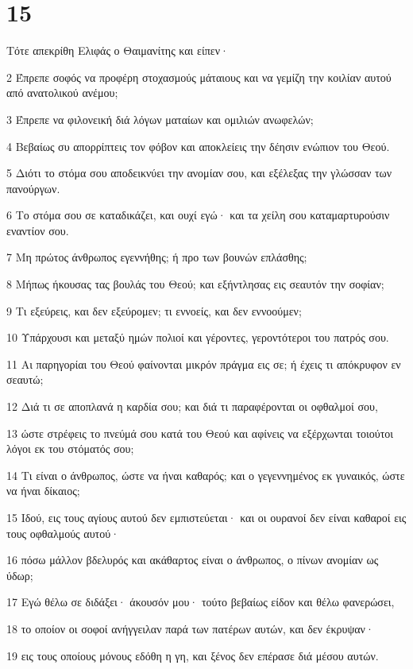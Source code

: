 \chapter{15}

\par Τότε απεκρίθη Ελιφάς ο Θαιμανίτης και είπεν·
\par 2 Έπρεπε σοφός να προφέρη στοχασμούς μάταιους και να γεμίζη την κοιλίαν αυτού από ανατολικού ανέμου;
\par 3 Έπρεπε να φιλονεική διά λόγων ματαίων και ομιλιών ανωφελών;
\par 4 Βεβαίως συ απορρίπτεις τον φόβον και αποκλείεις την δέησιν ενώπιον του Θεού.
\par 5 Διότι το στόμα σου αποδεικνύει την ανομίαν σου, και εξέλεξας την γλώσσαν των πανούργων.
\par 6 Το στόμα σου σε καταδικάζει, και ουχί εγώ· και τα χείλη σου καταμαρτυρούσιν εναντίον σου.
\par 7 Μη πρώτος άνθρωπος εγεννήθης; ή προ των βουνών επλάσθης;
\par 8 Μήπως ήκουσας τας βουλάς του Θεού; και εξήντλησας εις σεαυτόν την σοφίαν;
\par 9 Τι εξεύρεις, και δεν εξεύρομεν; τι εννοείς, και δεν εννοούμεν;
\par 10 Υπάρχουσι και μεταξύ ημών πολιοί και γέροντες, γεροντότεροι του πατρός σου.
\par 11 Αι παρηγορίαι του Θεού φαίνονται μικρόν πράγμα εις σε; ή έχεις τι απόκρυφον εν σεαυτώ;
\par 12 Διά τι σε αποπλανά η καρδία σου; και διά τι παραφέρονται οι οφθαλμοί σου,
\par 13 ώστε στρέφεις το πνεύμά σου κατά του Θεού και αφίνεις να εξέρχωνται τοιούτοι λόγοι εκ του στόματός σου;
\par 14 Τι είναι ο άνθρωπος, ώστε να ήναι καθαρός; και ο γεγεννημένος εκ γυναικός, ώστε να ήναι δίκαιος;
\par 15 Ιδού, εις τους αγίους αυτού δεν εμπιστεύεται· και οι ουρανοί δεν είναι καθαροί εις τους οφθαλμούς αυτού·
\par 16 πόσω μάλλον βδελυρός και ακάθαρτος είναι ο άνθρωπος, ο πίνων ανομίαν ως ύδωρ;
\par 17 Εγώ θέλω σε διδάξει· άκουσόν μου· τούτο βεβαίως είδον και θέλω φανερώσει,
\par 18 το οποίον οι σοφοί ανήγγειλαν παρά των πατέρων αυτών, και δεν έκρυψαν·
\par 19 εις τους οποίους μόνους εδόθη η γη, και ξένος δεν επέρασε διά μέσου αυτών.
